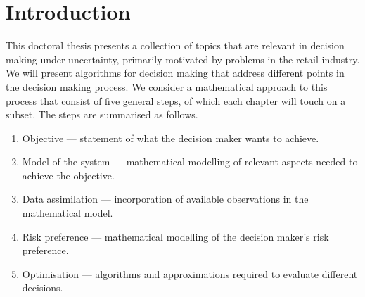 \documentclass[main.tex]{subfiles}
\begin{document}
\chapter{Introduction}
This doctoral thesis presents a collection of topics that are relevant
in decision making under uncertainty, primarily motivated by
problems in the retail industry.
We will present algorithms for decision making that address different
points in the decision making process.
We consider a mathematical approach to this process that consist of
five general steps, of which each chapter will touch on a subset.
The steps are summarised as follows.
\begin{enumerate}\label{enum:making_decisions}
\item Objective --- statement of what the decision maker wants to achieve.
\item Model of the system --- mathematical modelling of relevant aspects
  needed to achieve the objective.
\item Data assimilation --- incorporation of available observations in
  the mathematical model.
\item Risk preference --- mathematical modelling of the decision maker's risk
  preference.
\item Optimisation --- algorithms and approximations required to
  evaluate different decisions.
\end{enumerate}
\end{document}
